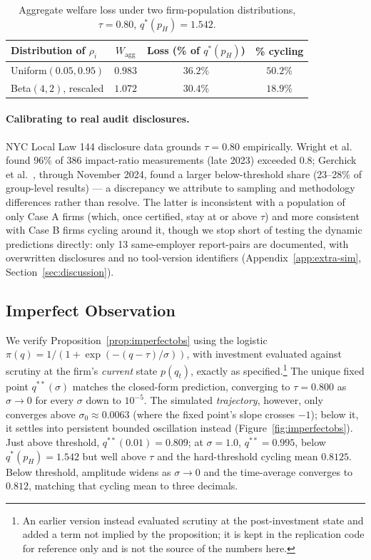 \begin{table}[t]
\centering
\caption{Aggregate welfare loss under two firm-population distributions, $\tau=0.80$, $q^*(p_H)=1.542$.}
\label{tab:aggwelfare}
\begin{tabular}{@{}lccc@{}}
\toprule
Distribution of $\rho_i$ & $W_{\mathrm{agg}}$ & Loss (\% of $q^*(p_H)$) & \% cycling \\
\midrule
Uniform$(0.05,0.95)$ & $0.983$ & $36.2\%$ & $50.2\%$ \\
Beta$(4,2)$, rescaled & $1.072$ & $30.4\%$ & $18.9\%$ \\
\bottomrule
\end{tabular}
\end{table}

\paragraph{Calibrating to real audit disclosures.}\label{sec:calibration} NYC Local Law 144 disclosure data grounds $\tau=0.80$ empirically. Wright et al.~\cite{wright2024null} found 96\% of 386 impact-ratio measurements (late 2023) exceeded $0.8$; Gerchick et al.~\cite{gerchick2025auditing}, through November 2024, found a larger below-threshold share (23--28\% of group-level results) — a discrepancy we attribute to sampling and methodology differences rather than resolve. The latter is inconsistent with a population of only Case A firms (which, once certified, stay at or above $\tau$) and more consistent with Case B firms cycling around it, though we stop short of testing the dynamic predictions directly: only 13 same-employer report-pairs are documented, with overwritten disclosures and no tool-version identifiers (Appendix~\ref{app:extra-sim}, Section~\ref{sec:discussion}).

\subsection{Imperfect Observation}
\label{sec:sim-imperfectobs}

We verify Proposition~\ref{prop:imperfectobs} using the logistic $\pi(q)=1/(1+\exp(-(q-\tau)/\sigma))$, with investment evaluated against scrutiny at the firm's \emph{current} state $p(q_t)$, exactly as specified.\footnote{An earlier version instead evaluated scrutiny at the post-investment state and added a term not implied by the proposition; it is kept in the replication code for reference only and is not the source of the numbers here.} The unique fixed point $q^{**}(\sigma)$ matches the closed-form prediction, converging to $\tau=0.800$ as $\sigma\to0$ for every $\sigma$ down to $10^{-5}$. The simulated \emph{trajectory}, however, only converges above $\sigma_0\approx0.0063$ (where the fixed point's slope crosses $-1$); below it, it settles into persistent bounded oscillation instead (Figure~\ref{fig:imperfectobs}). Just above threshold, $q^{**}(0.01)=0.809$; at $\sigma=1.0$, $q^{**}=0.995$, below $q^*(p_H)=1.542$ but well above $\tau$ and the hard-threshold cycling mean $0.8125$. Below threshold, amplitude widens as $\sigma\to0$ and the time-average converges to $0.812$, matching that cycling mean to three decimals.

